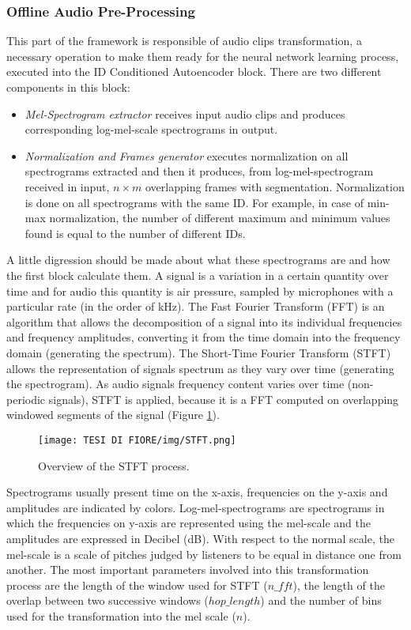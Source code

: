 \subsubsection{Offline Audio Pre-Processing}
This part of the framework is responsible of audio clips transformation, a necessary operation to make them ready for the neural network learning process, executed into the ID Conditioned Autoencoder block. There are two different components in this block:
\begin{itemize}
    \item {\textit{Mel-Spectrogram extractor} receives input audio clips and produces corresponding log-mel-scale spectrograms in output.}
    \item {\textit{Normalization and Frames generator} executes normalization on all spectrograms extracted and then it produces, from log-mel-spectrogram received in input, $n \times m$ overlapping frames with segmentation. Normalization is done on all spectrograms with the same ID. For example, in case of min-max normalization, the number of different maximum and minimum values found is equal to the number of different IDs. }
\end{itemize}
A little digression should be made about what these spectrograms are and how the first block calculate them. A signal is a variation in a certain quantity over time and for audio this quantity is air pressure, sampled by microphones with a particular rate (in the order of kHz). The Fast Fourier Transform (FFT) is an algorithm that allows the decomposition of a signal into its individual frequencies and frequency amplitudes, converting it from the time domain into the frequency domain (generating the spectrum). The Short-Time Fourier Transform (STFT) allows the representation of signals spectrum as they vary over time (generating the spectrogram). As audio signals frequency content varies over time (non-periodic signals), STFT is applied, because it is a FFT computed on overlapping windowed segments of the signal (Figure \ref{sftf}).\\
\begin{figure}[ht]
\texttt{[image: TESI DI FIORE/img/STFT.png]}
\centering
\caption{Overview of the STFT process.}
\label{sftf}
\end{figure}
Spectrograms usually present time on the x-axis, frequencies on the y-axis and amplitudes are indicated by colors. Log-mel-spectrograms are spectrograms in which the frequencies on y-axis are represented using the mel-scale and the amplitudes are expressed in Decibel (dB). With respect to the normal scale, the mel-scale is a scale of pitches judged by listeners to be equal in distance one from another. The most important parameters involved into this transformation process are the length of the window used for STFT ($n\_fft$), the length of the overlap between two successive windows ($hop\_length$) and the number of bins used for the transformation into the mel scale ($n$).
